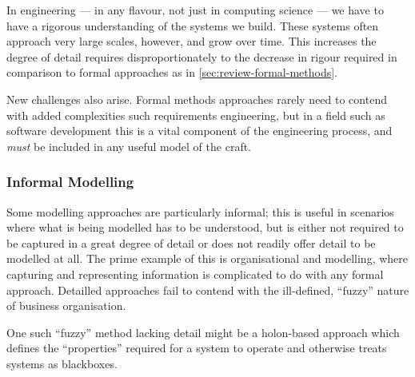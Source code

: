 In engineering --- in any flavour, not just in computing science --- we have to have a rigorous understanding of the systems we build. 
These systems often approach very large scales, however, and grow over time.
This increases the degree of detail requires disproportionately to the decrease in rigour required in comparison to formal approaches as in \ref{sec:review-formal-methods}.
\par

New challenges also arise. Formal methods approaches rarely need to contend with added complexities such requirements engineering, but in a field such as software development this is a vital component of the engineering process, and \emph{must} be included in any useful model of the craft.
\par


\subsubsection{Informal Modelling}
Some modelling approaches are particularly informal; this is useful in scenarios where what is being modelled has to be understood, but is either not required to be captured in a great degree of detail or does not readily offer detail to be modelled at all.
The prime example of this is organisational and modelling, where capturing and representing information is complicated to do with any formal approach.
Detailled approaches fail to contend with the ill-defined, ``fuzzy'' nature of business organisation.
\par

One such ``fuzzy'' method lacking detail might be a holon-based approach which defines the ``properties'' required for a system to operate and otherwise treats systems as blackboxes. 
\par

